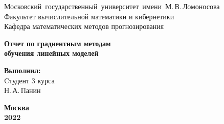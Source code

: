 \documentclass[14pt]{article} %
\begin{document}
\begin{titlepage}
	\thispagestyle{empty}
	\begin{center}
		Московский~государственный~университет~имени~М.\,В.\,Ломоносова\\
		Факультет вычислительной математики и кибернетики\\
		Кафедра математических методов прогнозирования\\
	\vfill

	\textbf{\Large Отчет по градиентным методам \\ обучения 
	линейных моделей}\\[4cm]
	\end{center}
	\hfill
	\begin{minipage}{0.3\textwidth}
		\large
		\raggedleft
		\textbf{Выполнил:\\[2mm]}
		\raggedleft
		Cтудент 3 курса\\
		Н.\,А.\,Панин
	\end{minipage}
	\vfill
	\begin{center}
		\large \bf Москва\\2022
	\end{center}

\end{titlepage}
\newpage

\newpage










\newpage
\end{document}
